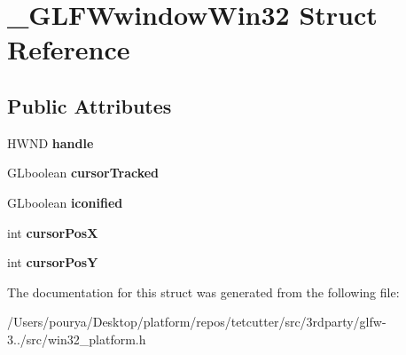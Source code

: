 \hypertarget{struct__GLFWwindowWin32}{}\section{\+\_\+\+G\+L\+F\+Wwindow\+Win32 Struct Reference}
\label{struct__GLFWwindowWin32}
\subsection*{Public Attributes}
\begin{DoxyCompactItemize}
\item 
\hypertarget{struct__GLFWwindowWin32_a3dcd617958be4eeb76edee0e0e955921}{}H\+W\+N\+D {\bfseries handle}\label{struct__GLFWwindowWin32_a3dcd617958be4eeb76edee0e0e955921}

\item 
\hypertarget{struct__GLFWwindowWin32_a9acfd267a0b4bde1fc9a51e717567709}{}G\+Lboolean {\bfseries cursor\+Tracked}\label{struct__GLFWwindowWin32_a9acfd267a0b4bde1fc9a51e717567709}

\item 
\hypertarget{struct__GLFWwindowWin32_ad5ea0639db2ef4ba07e7c85cd36f4dd7}{}G\+Lboolean {\bfseries iconified}\label{struct__GLFWwindowWin32_ad5ea0639db2ef4ba07e7c85cd36f4dd7}

\item 
\hypertarget{struct__GLFWwindowWin32_a7aece2613fe57fe482edcd7f1382f501}{}int {\bfseries cursor\+Pos\+X}\label{struct__GLFWwindowWin32_a7aece2613fe57fe482edcd7f1382f501}

\item 
\hypertarget{struct__GLFWwindowWin32_af844a8d81b0903f059c2d5c6c8d2e1b6}{}int {\bfseries cursor\+Pos\+Y}\label{struct__GLFWwindowWin32_af844a8d81b0903f059c2d5c6c8d2e1b6}

\end{DoxyCompactItemize}


The documentation for this struct was generated from the following file\+:\begin{DoxyCompactItemize}
\item 
/\+Users/pourya/\+Desktop/platform/repos/tetcutter/src/3rdparty/glfw-\/3../src/win32\+\_\+platform.\+h\end{DoxyCompactItemize}

